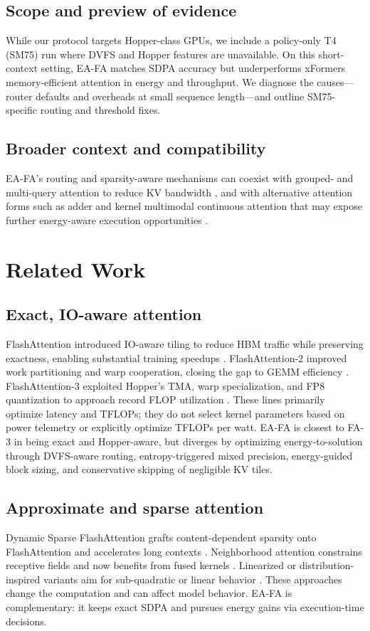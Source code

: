\documentclass{article}
\begin{document}
\subsection{Scope and preview of evidence}
While our protocol targets Hopper-class GPUs, we include a policy-only T4 (SM75) run where DVFS and Hopper features are unavailable. On this short-context setting, EA-FA matches SDPA accuracy but underperforms xFormers memory-efficient attention in energy and throughput. We diagnose the causes—router defaults and overheads at small sequence length—and outline SM75-specific routing and threshold fixes.

\subsection{Broader context and compatibility}
EA-FA’s routing and sparsity-aware mechanisms can coexist with grouped- and multi-query attention to reduce KV bandwidth \cite{ainslie-2023-gqa}, and with alternative attention forms such as adder and kernel multimodal continuous attention that may expose further energy-aware execution opportunities \cite{author-year-adder,author-year-kernel}.

\section{Related Work}
\subsection{Exact, IO-aware attention}
FlashAttention introduced IO-aware tiling to reduce HBM traffic while preserving exactness, enabling substantial training speedups \cite{dao-2022-flashattention}. FlashAttention-2 improved work partitioning and warp cooperation, closing the gap to GEMM efficiency \cite{dao-2023-flashattention}. FlashAttention-3 exploited Hopper’s TMA, warp specialization, and FP8 quantization to approach record FLOP utilization \cite{shah-2024-flashattention}. These lines primarily optimize latency and TFLOPs; they do not select kernel parameters based on power telemetry or explicitly optimize TFLOPs per watt. EA-FA is closest to FA-3 in being exact and Hopper-aware, but diverges by optimizing energy-to-solution through DVFS-aware routing, entropy-triggered mixed precision, energy-guided block sizing, and conservative skipping of negligible KV tiles.

\subsection{Approximate and sparse attention}
Dynamic Sparse FlashAttention grafts content-dependent sparsity onto FlashAttention and accelerates long contexts \cite{pagliardini-2023-fast}. Neighborhood attention constrains receptive fields and now benefits from fused kernels \cite{hassani-2024-faster}. Linearized or distribution-inspired variants aim for sub-quadratic or linear behavior \cite{rabe-2021-self,nguyen-2022-fourierformer,nahshan-2023-linear}. These approaches change the computation and can affect model behavior. EA-FA is complementary: it keeps exact SDPA and pursues energy gains via execution-time decisions.
\end{document}
